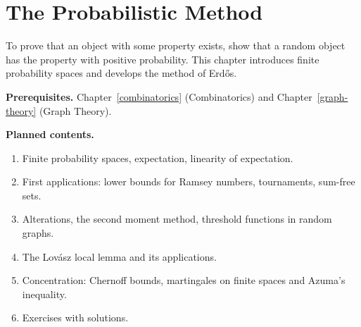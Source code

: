 \chapter{The Probabilistic Method}\label{probabilistic-method}

To prove that an object with some property exists, show that a random object has the property with
positive probability. This chapter introduces finite probability spaces and develops the method of
Erd\H{o}s.

\noindent\textbf{Prerequisites.} Chapter~\ref{combinatorics} (Combinatorics) and Chapter~\ref{graph-theory} (Graph Theory).

\noindent\textbf{Planned contents.}
\begin{enumerate}
\item Finite probability spaces, expectation, linearity of expectation.
\item First applications: lower bounds for Ramsey numbers, tournaments, sum-free sets.
\item Alterations, the second moment method, threshold functions in random graphs.
\item The Lov\'asz local lemma and its applications.
\item Concentration: Chernoff bounds, martingales on finite spaces and Azuma's inequality.
\item Exercises with solutions.
\end{enumerate}
